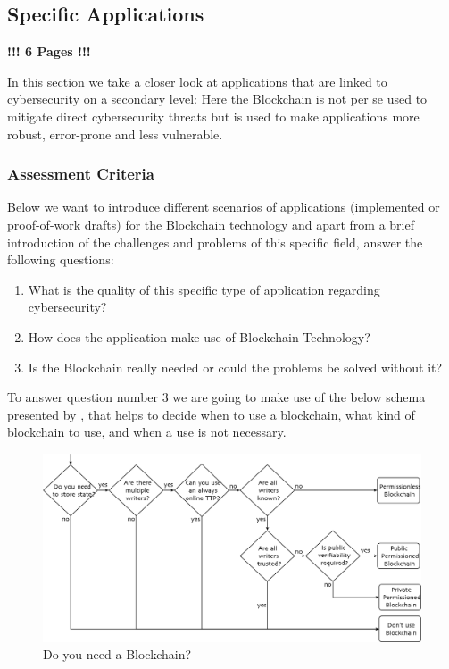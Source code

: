 \subsection{Specific Applications}
\label{subsec:03_applications}


\textbf{!!!  6 Pages  !!!}

In this section we take a closer look at applications that are linked to cybersecurity on a secondary level: Here the Blockchain is not per se used to mitigate direct cybersecurity threats but is used to make applications more robust, error-prone and less vulnerable.

\subsubsection{Assessment Criteria}
Below we want to introduce different scenarios of applications (implemented or proof-of-work drafts) for the Blockchain technology and apart from a brief introduction of the challenges and problems of this specific field, answer the following questions:
\begin{enumerate}
	\item What is the quality of this specific type of application regarding cybersecurity?
	\item How does the application make use of Blockchain Technology?
	\item Is the Blockchain really needed or could the problems be solved without it?
\end{enumerate}
To answer question number 3 we are going to make use of the below schema presented by \citeauthor{Wust2017}, that helps to decide when to use a blockchain, what kind of blockchain to use, and when a use is not necessary.
\begin{figure}[ht!]
	\begin{center}
		\includegraphics[scale=0.6]{Talk7/img/app/BCorNot}
	\end{center}
	\caption{Do you need a Blockchain?}
	\label{blockchain_or_not}
\end{figure}

